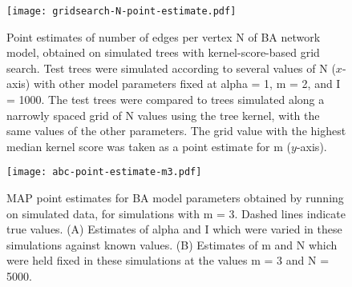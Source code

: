\begin{figure}[ht]
  \centering
  \texttt{[image: gridsearch-N-point-estimate.pdf]}
  \caption[
      Point estimates of number of edges per vertex \gls{N} of \acrlong{BA}
      network model, obtained on simulated trees with kernel-score-based grid
      search.
  ]{
      Point estimates of number of edges per vertex \gls{N} of \acrlong{BA}
      network model, obtained on simulated trees with kernel-score-based grid
      search. Test trees were simulated according to several values of \gls{N}
      ($x$-axis) with other model parameters fixed at \gls{alpha} = 1, \gls{m}
      = 2, and \gls{I} = 1000. The test trees were compared to trees simulated
      along a narrowly spaced grid of \gls{N} values using the tree kernel,
      with the same values of the other parameters. The grid value with the
      highest median kernel score was taken as a point estimate for \gls{m}
      ($y$-axis).
  }
  \label{fig:gridptN}
\end{figure}

\clearpage


\begin{figure}[ht]
  \centering
  \texttt{[image: abc-point-estimate-m3.pdf]}
  \caption[
    \Acrlong{MAP} point estimates for \gls{BA} model parameters obtained by
    running  on simulated data, for simulations with \gls{m} = 3.
  ]{
    \Acrlong{MAP} point estimates for \gls{BA} model parameters obtained by
    running  on simulated data, for simulations with \gls{m} = 3.
    Dashed lines indicate true values. (A) Estimates of \gls{alpha} and \gls{I}
    which were varied in these simulations against known values. (B) Estimates
    of \gls{m} and \gls{N} which were held fixed in these simulations at the
    values \gls{m} = 3 and \gls{N} = 5000.
  }        
  \label{fig:abcptm3}
\end{figure}

